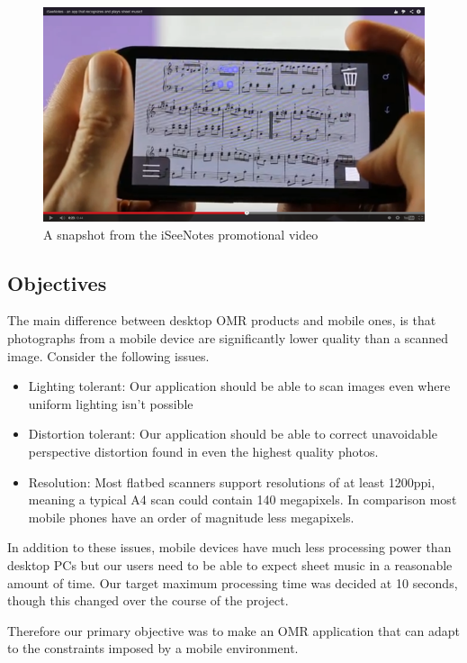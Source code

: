 \begin{figure}[ht!]
    \centering
    \includegraphics[width=120mm]{./assets/iseenotes.png}
    \caption{A snapshot from the iSeeNotes promotional video\cite{iSeeNotes}}
    \label{iseenotes}
\end{figure}

\subsection{Objectives}
The main difference between desktop OMR products and mobile ones, is that photographs from a mobile device are significantly lower quality than a scanned image. Consider the following issues.

\begin{itemize}
  \item Lighting tolerant: Our application should be able to scan images even where uniform lighting isn't possible
  \item Distortion tolerant: Our application should be able to correct unavoidable perspective distortion found in even the highest quality photos.
  \item Resolution: Most flatbed scanners support resolutions of at least 1200ppi, meaning a typical A4 scan could contain 140 megapixels. In comparison most mobile phones have an order of magnitude less megapixels.
\end{itemize}

In addition to these issues, mobile devices have much less processing power than desktop PCs but our users need to be able to expect sheet music in a reasonable amount of time. Our target maximum processing time was decided at 10 seconds, though this changed over the course of the project. 

Therefore our primary objective was to make an OMR application that can adapt to the constraints imposed by a mobile environment.

